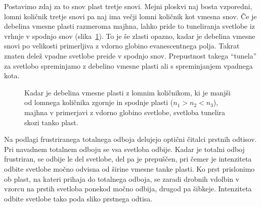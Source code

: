 Postavimo zdaj za to snov plast tretje snovi. Mejni ploskvi naj bosta vzporedni, lomni 
količnik tretje snovi pa naj ima večji lomni količnik kot vmesna snov. Če je debelina
vmesne plasti razmeroma majhna, lahko pride to tuneliranja
svetlobe iz vrhnje v spodnjo snov
(slika~\ref{fig:04_tunel}). To je še zlasti opazno, kadar je debelina vmesne snovi po 
velikosti primerljiva z vdorno globino evanescentnega polja. Takrat
znaten delež vpadne svetlobe preide v spodnjo snov. Prepustnost takega ``tunela'' za svetlobo 
spreminjamo z debelino vmesne plasti ali s spreminjanjem vpadnega kota.
\begin{figure}[ht]
\centering
\def\svgwidth{60truemm} 

\caption{Kadar je debelina vmesne plasti z lomnim količnikom, ki je manjši od lomnega količnika
zgornje in spodnje plasti ($n_1>n_2<n_3$), majhna v primerjavi z vdorno globino svetlobe, 
svetloba tunelira skozi tanko plast. }
\label{fig:04_tunel}
\end{figure}
\begin{remark}
Na podlagi frustriranega totalnega odboja delujejo optični čitalci prstnih odtisov. Pri 
navadnem totalnem odboju se vsa svetloba odbije. Kadar je totalni odboj frustriran, se 
odbije le del svetlobe, del pa je prepuščen, pri čemer je intenziteta odbite
svetlobe močno odvisna od širine vmesne tanke plasti. Ko prst prislonimo ob plast,
na kateri prihaja do totalnega odboja, se zaradi drobnih vdolbin v vzorcu na prstih
svetloba ponekod močno odbija, drugod pa šibkeje. Intenziteta odbite svetlobe
tako poda sliko prstnega odtisa.
\end{remark} 

